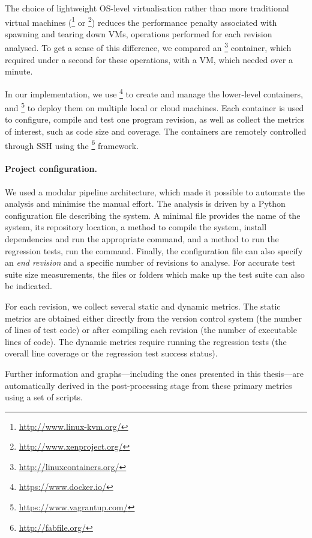 The choice of lightweight OS-level virtualisation rather than more traditional
virtual machines (\eg \kvm\footnote{\url{http://www.linux-kvm.org/}} or
\xen\footnote{\url{http://www.xenproject.org/}}) reduces the performance
penalty associated with spawning and tearing down VMs, operations performed for
each revision analysed.  To get a sense of this difference, we compared an
\lxc\footnote{\url{http://linuxcontainers.org/}} container, which required
under a second for these operations, with a \xen VM, which needed over a
minute.

In our implementation, we use \docker\footnote{\url{https://www.docker.io/}} to
create and manage the lower-level \lxc containers, and
\vagrant\footnote{\url{https://www.vagrantup.com/}} to deploy them on multiple
local or cloud machines.  Each container is used to configure, compile and test
one program revision, as well as collect the metrics of interest, such as code
size and coverage. The containers are remotely controlled through SSH using the
\fabric\footnote{\url{http://fabfile.org/}} framework.

\paragraph{Project configuration.} We used a modular pipeline architecture,
which made it possible to automate the analysis and minimise the manual effort.
The analysis is driven by a Python configuration file describing the system. A
minimal file provides the name of the system, its \git repository location, a
method to compile the system, \eg install dependencies and run the appropriate
 command, and a method to run the regression tests, \eg run the
 command.  Finally, the configuration file can also specify an
{\em end revision} and a specific number of revisions to analyse.  For accurate
test suite size measurements, the files or folders which make up the test suite
can also be indicated.

For each revision, we collect several static and dynamic metrics.  The static
metrics are obtained either directly from the version control system (\eg the
number of lines of test code) or after compiling each revision (\eg the number
of executable lines of code).  The dynamic metrics require running the
regression tests (\eg the overall line coverage or the regression test success
status).

Further information and graphs---including the ones presented in this
thesis---are automatically derived in the post-processing stage from these
primary metrics using a set of scripts.

